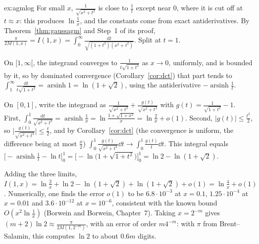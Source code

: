 \begin{solution}{ex:agmlog}
\idea For small $x$, $\frac1{\sqrt{x^2+t^2}}$ is close to $\frac1t$ except near $0$, where it is cut off at $t\approx x$: this produces $\ln\frac1x$, and the constants come from
exact antiderivatives.
\writeup By Theorem~\ref{thm:gaussagm} and Step~1 of its proof, $\frac\pi{2M(1,x)}=I(1,x)=\int_0^\infty\frac{\mathrm dt}{\sqrt{(1+t^2)(x^2+t^2)}}$. Split at $t=1$.

On $[1,\infty[$, the integrand converges to $\frac1{t\sqrt{1+t^2}}$ as $x\to0$, uniformly, and is bounded by it, so by dominated convergence (Corollary~\ref{cor:dct}) that part tends to
$\int_1^\infty\frac{\mathrm dt}{t\sqrt{1+t^2}}=\operatorname{arsinh}1=\ln(1+\sqrt2)$, using the antiderivative $-\operatorname{arsinh}\frac1t$.

On $[0,1]$, write the integrand as $\frac1{\sqrt{x^2+t^2}}+\frac{g(t)}{\sqrt{x^2+t^2}}$ with $g(t)=\frac1{\sqrt{1+t^2}}-1$. First, $\int_0^1\frac{\mathrm dt}{\sqrt{x^2+t^2}}=\operatorname{arsinh}\frac1x
=\ln\frac{1+\sqrt{1+x^2}}x=\ln\frac2x+o(1)$. Second, $|g(t)|\le\frac{t^2}2$, so $\bigl|\frac{g(t)}{\sqrt{x^2+t^2}}\bigr|\le\frac t2$, and by Corollary~\ref{cor:dct} (the convergence is uniform, the difference being at most $\frac x2$)
$\int_0^1\frac{g(t)}{\sqrt{x^2+t^2}}\dd t\to\int_0^1\frac{g(t)}t\dd t$. This integral equals $\bigl[-\operatorname{arsinh}\frac1t-\ln t\bigr]_0^1=\bigl[-\ln\bigl(1+\sqrt{1+t^2}\bigr)\bigr]_0^1=\ln2-\ln(1+\sqrt2)$.

Adding the three limits, $I(1,x)=\ln\frac2x+\ln2-\ln(1+\sqrt2)+\ln(1+\sqrt2)+o(1)=\ln\frac4x+o(1)$. Numerically, one finds the error $o(1)$ to be $6.8\cdot10^{-3}$ at $x=0.1$, $1.25\cdot10^{-4}$
at $x=0.01$ and $3.6\cdot10^{-12}$ at $x=10^{-6}$, consistent with the known bound $O(x^2\ln\frac1x)$ (Borwein and Borwein, Chapter~7). Taking $x=2^{-m}$ gives $(m+2)\ln2\approx\frac\pi{2M(1,2^{-m})}$, with an error of order $m4^{-m}$: with $\pi$ from Brent--Salamin, this computes $\ln2$ to about $0.6m$ digits.
\end{solution}

